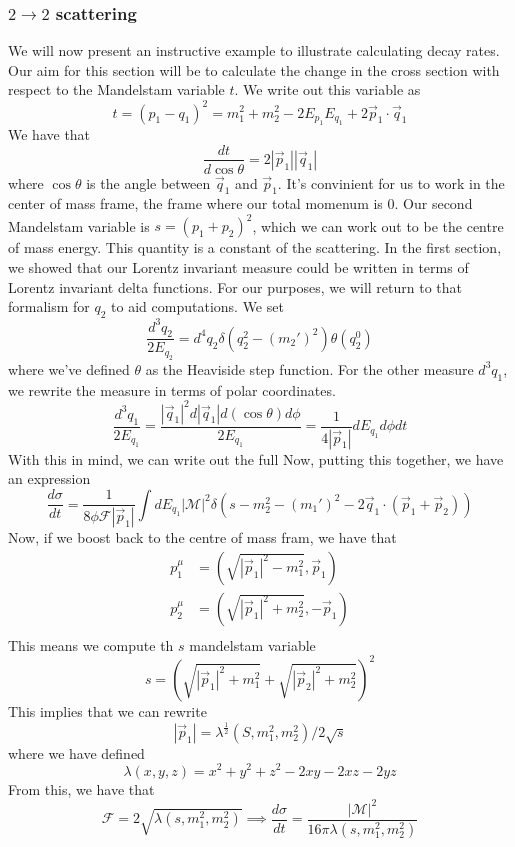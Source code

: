 \subsubsection{$ 2 \to 2 $ scattering}
We will now present an instructive 
example to illustrate calculating 
decay rates. Our aim for this section will be to 
calculate the change in the cross section with respect to 
the Mandelstam variable $ t $. 
We write out this variable as 
\[
	t =  ( p_1 - q_1) ^ 2 = m_1 ^ 2 + m_2 ^ 2 - 2 E_{ p _ 1 } E _{ q _ 1 } + 2 
	\vec{p} _ 1 \cdot  \vec{q} _ 1 
\] We have that 
\[
\frac{ d t }{ d \cos \theta } = 2 | \vec{p} _ 1 | | \vec{q} _ 1 | 
\] where  $ \cos \theta $ is the angle between $ \vec{q}  _ 1 $ and $ \vec{p} _ 1 $. 
It's convinient for us to work in the center of mass frame, 
the frame where our total momenum is $ 0 $. 
Our second Mandelstam variable is 
$ s= ( p_1 + p_2 ) ^ 2 $, which we can work out to be the centre 
of mass energy. This quantity is a constant of the scattering. 
In the first section, we showed that our Lorentz invariant measure 
could be written in terms of Lorentz invariant delta functions. 
For our purposes, we will return to that formalism for $ q_2  $ 
to aid computations. We set 
\[
	\frac{ d ^ 3 q_2 }{ 2 E _{ q_ 2 } } = d ^ 4 q _ 2 \delta ( q_2 ^ 2 - ( m_2 ') ^ 2 ) \theta ( q_2 ^ 0 ) 
\] where we've defined $ \theta $ as the Heaviside step function. 
For the other measure $ d ^ 3 q_1 $, we rewrite 
the measure in terms of polar coordinates. 
\[
	\frac{ d ^ 3 q_1 }{ 2 E _{ q_1 } } = \frac{ | \vec{q} _ 1 | ^ 2 d | \vec{q} _1 | d ( \cos \theta ) 
	d \phi }{ 2 E_{ q_{1 } }} = \frac{1}{ 4 | \vec{p} _ 1 | } d E_{ q_ 1 } d \phi dt 
\] With this in mind, we can write out 
the full Now, putting this together, 
we have an expression 
\[
 \frac{ d \sigma }{ dt } = \frac{1}{8 \phi \mathcal{ F } | \vec{p}_ 1  | } 
 \int d E_{ q_ 1 } | \mathcal{ M } | ^ 2 \delta ( s - m_2 ^ 2  -  ( m_1')  ^ 2 - 2 \vec{q} _ 1 
 \cdot  ( \vec{p} _ 1 + \vec{p} _ 2 ) ) 
\] Now, if we boost back to the centre of mass fram, we have that 
\begin{align*}
	p_1 ^\mu & = ( \sqrt{| \vec{p} _ 1 | ^  2 - m_1 ^ 2 }, \vec{p} _ 1 )  \\
	p_2 ^ \mu &=  ( \sqrt{ | \vec{p} _ 1 | ^ 2 + m_2 ^ 2 }, - \vec{p} _ 1 )   \\
\end{align*}
This means we compute th $ s $ mandelstam variable 
\[
	s = ( \sqrt{ | \vec{p} _1 | ^ 2 + m_1 ^ 2  } + \sqrt{ | \vec{p} _ 2 |^ 2 + m_2 ^ 2  } ) ^ 2  
\] This implies that we can rewrite 
\[
	| \vec{p} _ 1 | = \lambda ^{ \frac{1}{2 } } ( S, m_1 ^ 2 , m_2 ^ 2 ) / 2 \sqrt{ s }  
\] where we have defined 
\[
 \lambda ( x, y , z ) = x^ 2 + y ^ 2 + z ^ 2 - 2xy - 2xz - 2yz
\] From this, we have that 
\[
	\mathcal{ F } = 2 \sqrt{ \lambda ( s , m_1 ^ 2 , m_2 ^ 2 ) } \implies 
	\frac{ d \sigma }{ d t } = \frac{ | \mathcal{ M } | ^ 2 }{ 16 \pi \lambda ( s , m_1 ^ 2 , m_2 ^ 2 ) }
\] 
